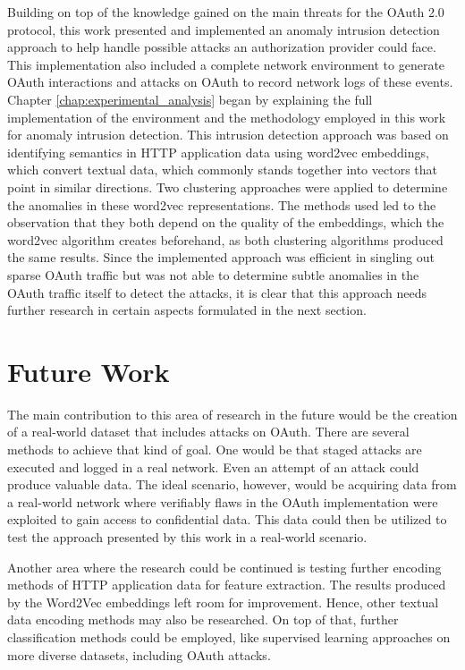 \documentclass[
    fontsize=12pt,
    headings=small,
    parskip=half,           %
    bibliography=totoc,
    numbers=noenddot,       %
    open=any,               %
    ]{scrreprt}
\begin{document}
Building on top of the knowledge gained on the main threats for the OAuth 2.0 protocol, this work presented and implemented an anomaly intrusion detection approach to help handle possible attacks an authorization provider could face. This implementation also included a complete network environment to generate OAuth interactions and attacks on OAuth to record network logs of these events. Chapter \ref{chap:experimental_analysis} began by explaining the full implementation of the environment and the methodology employed in this work for anomaly intrusion detection.
This intrusion detection approach was based on identifying semantics in HTTP application data using word2vec embeddings, which convert textual data, which commonly stands together into vectors that point in similar directions. Two clustering approaches were applied to determine the anomalies in these word2vec representations. The methods used led to the observation that they both depend on the quality of the embeddings, which the word2vec algorithm creates beforehand, as both clustering algorithms produced the same results. Since the implemented approach was efficient in singling out sparse OAuth traffic but was not able to determine subtle anomalies in the OAuth traffic itself to detect the attacks, it is clear that this approach needs further research in certain aspects formulated in the next section.

\section{Future Work}
\label{sec:future_work}

The main contribution to this area of research in the future would be the creation of a real-world dataset that includes attacks on OAuth. There are several methods to achieve that kind of goal. One would be that staged attacks are executed and logged in a real network. Even an attempt of an attack could produce valuable data. The ideal scenario, however, would be acquiring data from a real-world network where verifiably flaws in the OAuth implementation were exploited to gain access to confidential data. This data could then be utilized to test the approach presented by this work in a real-world scenario.

Another area where the research could be continued is testing further encoding methods of HTTP application data for feature extraction. The results produced by the Word2Vec embeddings left room for improvement. Hence, other textual data encoding methods may also be researched. On top of that, further classification methods could be employed, like supervised learning approaches on more diverse datasets, including OAuth attacks.
\end{document}

